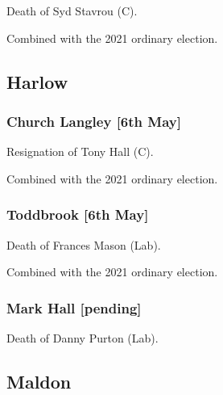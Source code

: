 \documentclass[a4paper,openany]{book}
\begin{document}
\begin{resultsiii}

Death of Syd Stavrou (C).

Combined with the 2021 ordinary election.

\subsection*{Harlow}

\subsubsection*{Church Langley \hspace*{\fill}\nolinebreak[1]%
	\enspace\hspace*{\fill}
	[6th May]}


Resignation of Tony Hall (C).

Combined with the 2021 ordinary election.

\subsubsection*{Toddbrook \hspace*{\fill}\nolinebreak[1]%
	\enspace\hspace*{\fill}
	[6th May]}


Death of Frances Mason (Lab).

Combined with the 2021 ordinary election.

\subsubsection*{Mark Hall \hspace*{\fill}\nolinebreak[1]%
	\enspace\hspace*{\fill}
	[pending]}


Death of Danny Purton (Lab).

\subsection*{Maldon}


\end{resultsiii}
\end{document}
